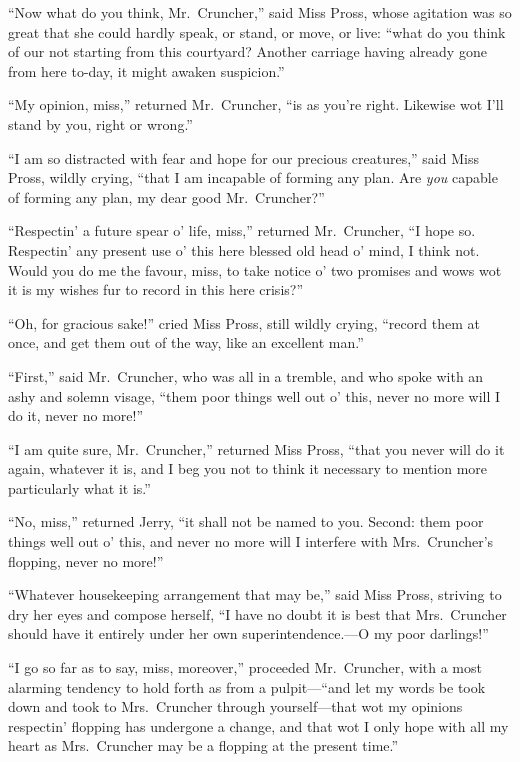 ``Now what do you think, Mr.\ Cruncher,'' said Miss Pross, whose
agitation was so great that she could hardly speak, or stand,
or move, or live:  ``what do you think of our not starting from this
courtyard?  Another carriage having already gone from here to-day,
it might awaken suspicion.''

``My opinion, miss,'' returned Mr.\ Cruncher, ``is as you're right.
Likewise wot I'll stand by you, right or wrong.''

``I am so distracted with fear and hope for our precious creatures,''
said Miss Pross, wildly crying, ``that I am incapable of forming any
plan. Are \emph{you} capable of forming any plan, my dear good Mr.\ Cruncher?''

``Respectin' a future spear o' life, miss,'' returned Mr.\ Cruncher,
``I hope so.  Respectin' any present use o' this here blessed old head
o' mind, I think not.  Would you do me the favour, miss, to take
notice o' two promises and wows wot it is my wishes fur to record in
this here crisis?''

``Oh, for gracious sake!'' cried Miss Pross, still wildly crying,
``record them at once, and get them out of the way, like an excellent man.''

``First,'' said Mr.\ Cruncher, who was all in a tremble, and who spoke
with an ashy and solemn visage, ``them poor things well out o' this,
never no more will I do it, never no more!''

``I am quite sure, Mr.\ Cruncher,'' returned Miss Pross, ``that you never
will do it again, whatever it is, and I beg you not to think it
necessary to mention more particularly what it is.''

``No, miss,'' returned Jerry, ``it shall not be named to you.  Second:
them poor things well out o' this, and never no more will I interfere
with Mrs.\ Cruncher's flopping, never no more!''

``Whatever housekeeping arrangement that may be,'' said Miss Pross,
striving to dry her eyes and compose herself, ``I have no doubt it
is best that Mrs.\ Cruncher should have it entirely under her own
superintendence.---O my poor darlings!''

``I go so far as to say, miss, moreover,'' proceeded Mr.\ Cruncher, with
a most alarming tendency to hold forth as from a pulpit---``and let my
words be took down and took to Mrs.\ Cruncher through yourself---that
wot my opinions respectin' flopping has undergone a change, and that
wot I only hope with all my heart as Mrs.\ Cruncher may be a flopping
at the present time.''

